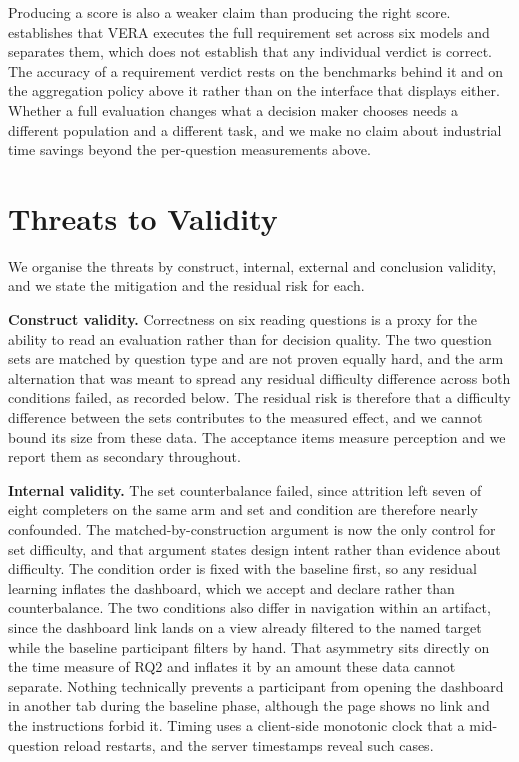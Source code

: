 \documentclass[10pt,conference]{IEEEtran}
\begin{document}
Producing a score is also a weaker claim than producing the right score.
 establishes that VERA executes the full requirement set across six models and separates them, which does not establish that any individual verdict is correct.
The accuracy of a requirement verdict rests on the benchmarks behind it and on the aggregation policy above it rather than on the interface that displays either.
Whether a full evaluation changes what a decision maker chooses needs a different population and a different task, and we make no claim about industrial time savings beyond the per-question measurements above.

\section{Threats to Validity}
\label{sec:threats}

We organise the threats by construct, internal, external and conclusion validity, and we state the mitigation and the residual risk for each.

\textbf{Construct validity.}
Correctness on six reading questions is a proxy for the ability to read an evaluation rather than for decision quality.
The two question sets are matched by question type and are not proven equally hard, and the arm alternation that was meant to spread any residual difficulty difference across both conditions failed, as recorded below.
The residual risk is therefore that a difficulty difference between the sets contributes to the measured effect, and we cannot bound its size from these data.
The acceptance items measure perception and we report them as secondary throughout.

\textbf{Internal validity.}
The set counterbalance failed, since attrition left seven of eight completers on the same arm and set and condition are therefore nearly confounded.
The matched-by-construction argument is now the only control for set difficulty, and that argument states design intent rather than evidence about difficulty.
The condition order is fixed with the baseline first, so any residual learning inflates the dashboard, which we accept and declare rather than counterbalance.
The two conditions also differ in navigation within an artifact, since the dashboard link lands on a view already filtered to the named target while the baseline participant filters by hand.
That asymmetry sits directly on the time measure of RQ2 and inflates it by an amount these data cannot separate.
Nothing technically prevents a participant from opening the dashboard in another tab during the baseline phase, although the page shows no link and the instructions forbid it.
Timing uses a client-side monotonic clock that a mid-question reload restarts, and the server timestamps reveal such cases.
\end{document}
